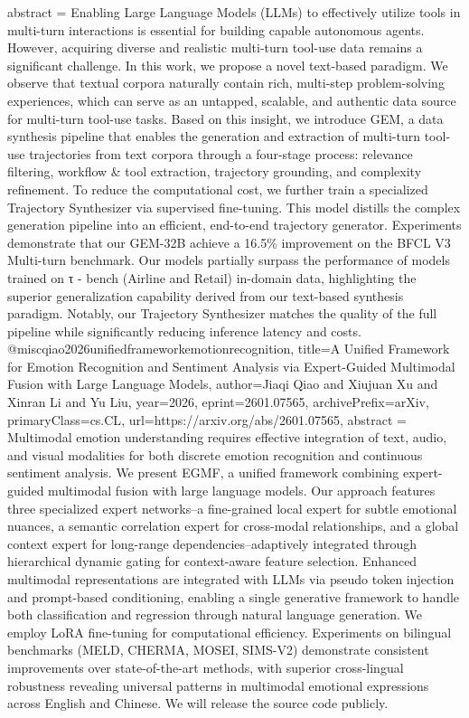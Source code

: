 {      abstract = {Enabling Large Language Models (LLMs) to effectively utilize tools in multi-turn interactions is essential for building capable autonomous agents. However, acquiring diverse and realistic multi-turn tool-use data remains a significant challenge. In this work, we propose a novel text-based paradigm. We observe that textual corpora naturally contain rich, multi-step problem-solving experiences, which can serve as an untapped, scalable, and authentic data source for multi-turn tool-use tasks. Based on this insight, we introduce GEM, a data synthesis pipeline that enables the generation and extraction of multi-turn tool-use trajectories from text corpora through a four-stage process: relevance filtering, workflow & tool extraction, trajectory grounding, and complexity refinement. To reduce the computational cost, we further train a specialized Trajectory Synthesizer via supervised fine-tuning. This model distills the complex generation pipeline into an efficient, end-to-end trajectory generator. Experiments demonstrate that our GEM-32B achieve a 16.5\% improvement on the BFCL V3 Multi-turn benchmark. Our models partially surpass the performance of models trained on τ - bench (Airline and Retail) in-domain data, highlighting the superior generalization capability derived from our text-based synthesis paradigm. Notably, our Trajectory Synthesizer matches the quality of the full pipeline while significantly reducing inference latency and costs.}
}@misc{qiao2026unifiedframeworkemotionrecognition,
      title={A Unified Framework for Emotion Recognition and Sentiment Analysis via Expert-Guided Multimodal Fusion with Large Language Models}, 
      author={Jiaqi Qiao and Xiujuan Xu and Xinran Li and Yu Liu},
      year={2026},
      eprint={2601.07565},
      archivePrefix={arXiv},
      primaryClass={cs.CL},
      url={https://arxiv.org/abs/2601.07565},
      abstract = {Multimodal emotion understanding requires effective integration of text, audio, and visual modalities for both discrete emotion recognition and continuous sentiment analysis. We present EGMF, a unified framework combining expert-guided multimodal fusion with large language models. Our approach features three specialized expert networks--a fine-grained local expert for subtle emotional nuances, a semantic correlation expert for cross-modal relationships, and a global context expert for long-range dependencies--adaptively integrated through hierarchical dynamic gating for context-aware feature selection. Enhanced multimodal representations are integrated with LLMs via pseudo token injection and prompt-based conditioning, enabling a single generative framework to handle both classification and regression through natural language generation. We employ LoRA fine-tuning for computational efficiency. Experiments on bilingual benchmarks (MELD, CHERMA, MOSEI, SIMS-V2) demonstrate consistent improvements over state-of-the-art methods, with superior cross-lingual robustness revealing universal patterns in multimodal emotional expressions across English and Chinese. We will release the source code publicly.}
}
